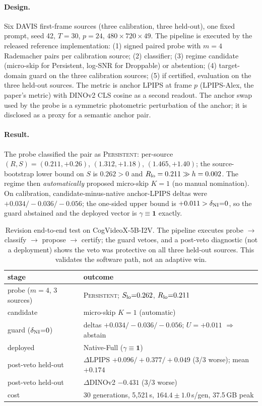 \documentclass[letterpaper]{article}
\begin{document}
\paragraph{Design.} Six DAVIS first-frame sources (three calibration,
three held-out), one fixed prompt, seed 42, $T{=}30$, $p{=}24$,
$480{\times}720{\times}49$. The pipeline is executed by the released
reference implementation: (1) signed paired probe with $m{=}4$ Rademacher
pairs per calibration source; (2) classifier; (3) regime candidate
(micro-skip for Persistent, log-SNR for Droppable) or abstention;
(4) target-domain guard on the three calibration sources; (5) if
certified, evaluation on the three held-out sources. The metric is
anchor LPIPS at frame $p$ (LPIPS-Alex, the paper's metric) with DINOv2
CLS cosine as a second readout. The anchor swap used by the probe is a
symmetric photometric perturbation of the anchor; it is disclosed as a
proxy for a semantic anchor pair.

\paragraph{Result.} The probe classified the pair as
\textsc{Persistent}: per-source $(R,S)=(0.211,{+}0.26)$,
$(1.312,{+}1.18)$, $(1.465,{+}1.40)$; the source-bootstrap lower bound
on $S$ is $0.262>0$ and $R_{\rm lo}=0.211\gg h=0.002$. The regime
then \emph{automatically} proposed micro-skip $K{=}1$ (no manual
nomination). On calibration, candidate-minus-native anchor-LPIPS
deltas were $+0.034/-0.036/-0.056$; the one-sided upper bound is
$+0.011>\delta_{\rm NI}{=}0$, so the guard abstained and the deployed
vector is $\gamma\equiv\mathbf 1$ exactly.

\begin{table}[h]\centering\small
\begin{tabular}{@{}p{}p{}@{}}
\toprule
stage & outcome\\\midrule
probe ($m{=}4$, 3 sources) & \textsc{Persistent}; $S_{\rm lo}{=}0.262$, $R_{\rm lo}{=}0.211$\\
candidate & micro-skip $K{=}1$ (automatic)\\
guard ($\delta_{\rm NI}{=}0$) & deltas $+0.034/-0.036/-0.056$; $U{=}{+}0.011$ $\Rightarrow$ abstain\\
deployed & Native-Full ($\gamma\equiv\mathbf 1$)\\
post-veto held-out & $\Delta$LPIPS $+0.096/+0.377/+0.049$ (3/3 worse); mean $+0.174$\\
post-veto held-out & $\Delta$DINOv2 $-0.431$ (3/3 worse)\\
cost & 30 generations, 5{,}521\,s, $164.4{\pm}1.0$\,s/gen, 37.5\,GB peak\\
\bottomrule
\end{tabular}
\caption{Revision end-to-end test on CogVideoX-5B-I2V. The pipeline
executes probe $\to$ classify $\to$ propose $\to$ certify; the guard
vetoes, and a post-veto diagnostic (not a deployment) shows the veto
was protective on all three held-out sources. This validates the
software path, not an adaptive win.}
\end{table}
\end{document}
